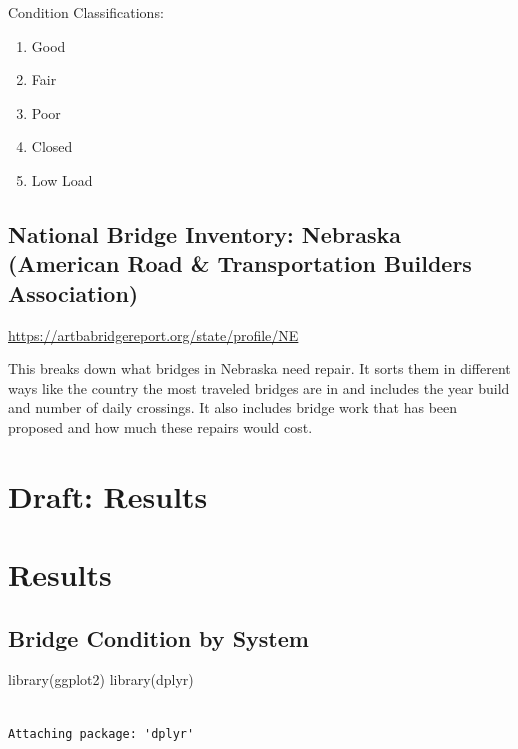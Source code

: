 \documentclass[
  letterpaper,
  DIV=11,
  numbers=noendperiod]{scrreprt}
\newenvironment{Shaded}{\begin{snugshade}}{\end{snugshade}}
\newcommand{\FunctionTok}[1]{\textcolor[rgb]{0.28,0.35,0.67}{#1}}
\newcommand{\NormalTok}[1]{\textcolor[rgb]{0.00,0.23,0.31}{#1}}
\providecommand{\tightlist}{%
  \setlength{\itemsep}{0pt}\setlength{\parskip}{0pt}}\usepackage{longtable,booktabs,array}
\begin{document}
Condition Classifications:

\begin{enumerate}
\def\labelenumi{\arabic{enumi}.}
\tightlist
\item
  Good
\item
  Fair
\item
  Poor
\item
  Closed
\item
  Low Load
\end{enumerate}

\section{National Bridge Inventory: Nebraska (American Road \&
Transportation Builders
Association)}\label{national-bridge-inventory-nebraska-american-road-transportation-builders-association}

\url{https://artbabridgereport.org/state/profile/NE}

This breaks down what bridges in Nebraska need repair. It sorts them in
different ways like the country the most traveled bridges are in and
includes the year build and number of daily crossings. It also includes
bridge work that has been proposed and how much these repairs would
cost.

\chapter{Draft: Results}\label{draft-results}

\chapter{Results}\label{results-3}

\section{Bridge Condition by System}\label{bridge-condition-by-system-1}

\begin{Shaded}
\begin{Highlighting}[]
\FunctionTok{library}\NormalTok{(ggplot2)}
\FunctionTok{library}\NormalTok{(dplyr)}
\end{Highlighting}
\end{Shaded}

\begin{verbatim}

Attaching package: 'dplyr'
\end{verbatim}
\end{document}
